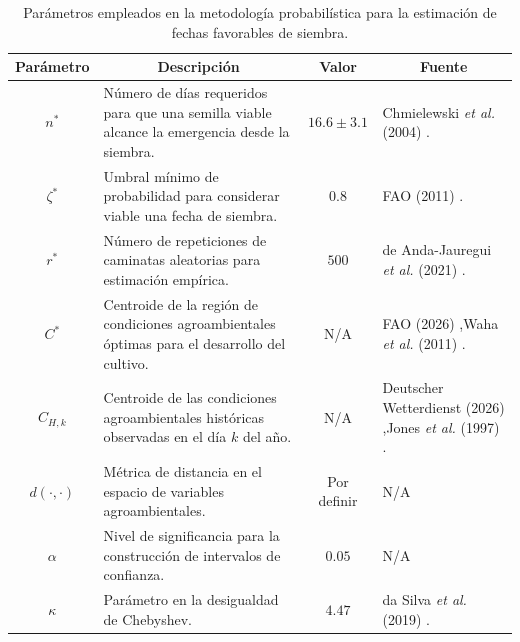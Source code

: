 \begin{table}[H]
	\centering
	\begin{tabular}{c|p{5cm}|c|p{5.8cm}}
		\hline
		\textbf{Parámetro} & \multicolumn{1}{c|}{\textbf{Descripción}} & \textbf{Valor} & \multicolumn{1}{c}{\textbf{Fuente}} \\
		\hline
		$n^*$ & Número de días requeridos para que una semilla viable alcance la emergencia desde la siembra. & $16.6\pm3.1$ & Chmielewski \textit{et al.} (2004) \cite{CHMIELEWSKI_2004}. \\
		\hline
		$\zeta^*$ & Umbral mínimo de probabilidad para considerar viable una fecha de siembra. & $0.8$ & FAO (2011) \cite[p. 57]{FAO_2011}. \\
		\hline
		$r^*$ & Número de repeticiones de caminatas aleatorias para estimación empírica. & $500$ & de Anda-Jauregui \textit{et al.} (2021) \cite{deAndaJauregui_2021}. \\
		\hline
		$C^*$ & Centroide de la región de condiciones agroambientales óptimas para el desarrollo del cultivo. & 	N/A & FAO (2026) \cite{FAO_maize_2026},\newline Waha \textit{et al.} (2011) \cite{Waha_2011}. 
		\\
		\hline
		$C_{H,k}$ & Centroide de las condiciones agroambientales históricas observadas en el día $k$ del año. & 	N/A & Deutscher Wetterdienst (2026) \cite{DWD_2026},\newline Jones \textit{et al.} (1997) \cite{Jones_1997}.  \\
		\hline
		$d(\cdot,\cdot)$ & Métrica de distancia en el espacio de variables agroambientales. & Por definir & \begin{center}
			N/A
		\end{center}  \\
		\hline
		$\alpha$ & Nivel de significancia para la construcción de intervalos de confianza. & $0.05$ &  \begin{center}
			N/A
		\end{center}  \\
		\hline
		$\kappa$ & Parámetro en la desigualdad de Chebyshev. & $4.47$ & da Silva \textit{et al.} (2019) \cite{daSilva_2019}.
		 \\
		\hline
	\end{tabular}
	\caption{Parámetros empleados en la metodología probabilística para la estimación de fechas favorables de siembra.}
	\label{Parameters}
\end{table}



